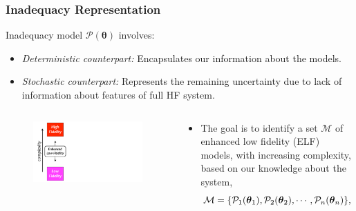 \documentclass[10pt,xcolor=dvipsnames,compress]{beamer}
\begin{document}
\begin{frame}
\frametitle{Inadequacy Representation}
\vfill


Inadequacy model $\mathcal{P}(\boldsymbol{\theta})$ involves:
\begin{itemize}
\item \textit{Deterministic counterpart:}
Encapsulates our information about the models.

\item \textit{Stochastic counterpart:}
Represents the remaining uncertainty due to lack of information about features of full HF system.
\end{itemize}

\pause

\begin{columns}
\begin{figure}[h]
    \centering
    \includegraphics[trim = 0.in 0.in 9.in 0in, clip, width=1\textwidth]{figs/ELFmodel.pdf} 
\end{figure}


\begin{block}{}

\begin{itemize}
\item The goal is to identify a set $\mathcal{M}$ of enhanced low fidelity (ELF) models, with increasing complexity,  based on our knowledge about the system, 
\vspace{-0.1in}
\begin{equation*}
\mathcal{M} = \{\mathcal{P}_1(\boldsymbol{\theta}_1), \mathcal{P}_2(\boldsymbol{\theta}_2), \cdots, \mathcal{P}_n(\boldsymbol{\theta}_n)  \},
\vspace{-0.1in}
\end{equation*}


\end{itemize}
\end{block}
\end{columns}
\end{frame}
\end{document}
